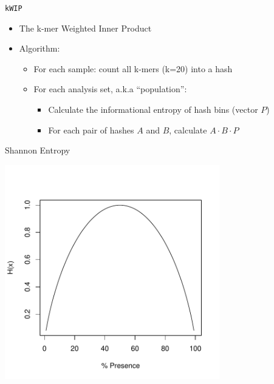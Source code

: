 \documentclass[t]{beamer}
\begin{document}
\begin{frame}{\texttt{kWIP}}
  \begin{itemize}
    \item The k-mer Weighted Inner Product
    \pause
    \item Algorithm:
      \begin{itemize}
        \item For each sample: count all k-mers (k=20) into a hash
        \pause
        \item For each analysis set, a.k.a ``population'':
          \begin{itemize}
            \item Calculate the informational entropy of hash bins (vector $P$)
            \item For each pair of hashes $A$ and $B$, calculate $A \cdot B
                  \cdot P$
          \end{itemize}
      \end{itemize}
    \pause
  \end{itemize}
\end{frame}

\begin{frame}{Shannon Entropy}
  \begin{center}
    \includegraphics[width=0.7\textwidth]{img/shanent.pdf}
  \end{center}
\end{frame}
\end{document}

